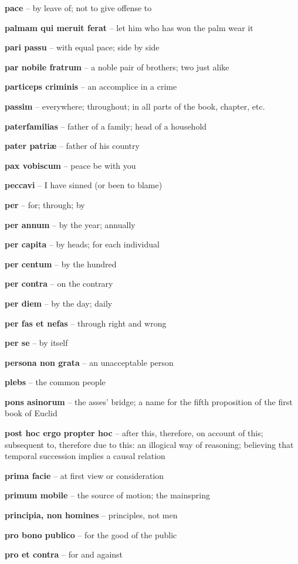 \documentclass[12pt]{article}
\newcommand{\lat}[1]{\textbf{#1}}
\begin{document}
\lat{pace} -- by leave of; not to give offense to

\lat{palmam qui meruit ferat} -- let him who has won the palm wear it

\lat{pari passu} -- with equal pace; side by side

\lat{par nobile fratrum} -- a noble pair of brothers; two just alike

\lat{particeps criminis} -- an accomplice in a crime


\lat{passim} -- everywhere; throughout; in all parts of the book, chapter, etc.

\lat{paterfamilias} -- father of a family; head of a household

\lat{pater patri\ae} -- father of his country

\lat{pax vobiscum} -- peace be with you

\lat{peccavi} -- I have sinned (or been to blame)

\lat{per} -- for; through; by

\lat{per annum} -- by the year; annually

\lat{per capita} -- by heads; for each individual

\lat{per centum} -- by the hundred

\lat{per contra} -- on the contrary

\lat{per diem} -- by the day; daily

\lat{per fas et nefas} -- through right and wrong

\lat{per se} -- by itself

\lat{persona non grata} -- an unacceptable person

\lat{plebs} -- the common people

\lat{pons asinorum} -- the asses' bridge; a name for the fifth proposition of the first book of Euclid

\lat{post hoc ergo propter hoc} -- after this, therefore, on account of this; subsequent to, therefore due to this: an illogical way of reasoning; believing that temporal succession implies a causal relation

\lat{prima facie} -- at first view or consideration

\lat{primum mobile} -- the source of motion; the mainspring

\lat{principia, non homines} -- principles, not men

\lat{pro bono publico} -- for the good of the public

\lat{pro et contra} -- for and against
\end{document}
